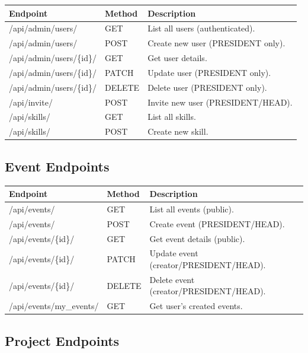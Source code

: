 \documentclass[11pt,a4paper]{article}
\begin{document}
\begin{tabular}{|p{4cm}|p{2cm}|p{8cm}|}
\hline
\textbf{Endpoint} & \textbf{Method} & \textbf{Description} \\
\hline
/api/admin/users/ & GET & List all users (authenticated). \\
\hline
/api/admin/users/ & POST & Create new user (PRESIDENT only). \\
\hline
/api/admin/users/\{id\}/ & GET & Get user details. \\
\hline
/api/admin/users/\{id\}/ & PATCH & Update user (PRESIDENT only). \\
\hline
/api/admin/users/\{id\}/ & DELETE & Delete user (PRESIDENT only). \\
\hline
/api/invite/ & POST & Invite new user (PRESIDENT/HEAD). \\
\hline
/api/skills/ & GET & List all skills. \\
\hline
/api/skills/ & POST & Create new skill. \\
\hline
\end{tabular}

\subsection{Event Endpoints}

\begin{tabular}{|p{4cm}|p{2cm}|p{8cm}|}
\hline
\textbf{Endpoint} & \textbf{Method} & \textbf{Description} \\
\hline
/api/events/ & GET & List all events (public). \\
\hline
/api/events/ & POST & Create event (PRESIDENT/HEAD). \\
\hline
/api/events/\{id\}/ & GET & Get event details (public). \\
\hline
/api/events/\{id\}/ & PATCH & Update event (creator/PRESIDENT/HEAD). \\
\hline
/api/events/\{id\}/ & DELETE & Delete event (creator/PRESIDENT/HEAD). \\
\hline
/api/events/my\_events/ & GET & Get user's created events. \\
\hline
\end{tabular}


\subsection{Project Endpoints}
\end{document}
